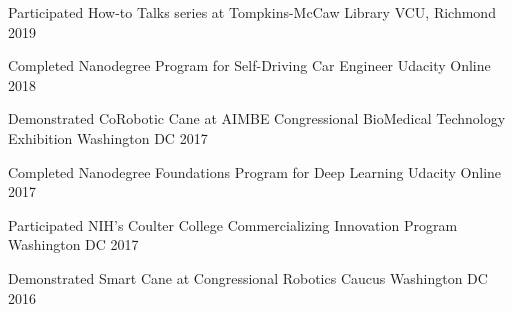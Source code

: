 
\begin{cvhonors}
	\myevent
	{Participated How-to Talks series at Tompkins-McCaw Library}
	{VCU, Richmond}
	{2019}
	
	\myevent
	{Completed Nanodegree Program for Self-Driving Car Engineer}
	{Udacity Online}
	{2018}
	
	\myevent
	{Demonstrated CoRobotic Cane at AIMBE Congressional BioMedical Technology Exhibition}
	{Washington DC}
	{2017}
	
	\myevent
	{Completed Nanodegree Foundations Program for Deep Learning}
	{Udacity Online}
	{2017}
	
	\myevent
	{Participated NIH’s Coulter College Commercializing Innovation Program}
	{Washington DC}
	{2017}
	
	\myevent
	{Demonstrated Smart Cane at Congressional Robotics Caucus}
	{Washington DC}
	{2016}
	
	
\end{cvhonors}




